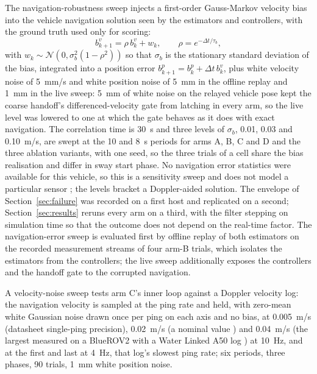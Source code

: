 The navigation-robustness sweep injects a first-order Gauss-Markov velocity bias into the vehicle navigation solution seen by the estimators and controllers, with the ground truth used only for scoring:
\begin{equation}
b^v_{k+1} = \rho\, b^v_k + w_k,\qquad \rho = e^{-\Delta t/\tau_b},
\end{equation}
with $w_k \sim \mathcal{N}(0, \sigma_b^2 (1-\rho^2))$ so that $\sigma_b$ is the stationary standard deviation of the bias,
integrated into a position error $b^p_{k+1} = b^p_k + \Delta t\, b^v_k$, plus white velocity noise of 5~mm/s and white position noise of 5~mm in the offline replay and 1~mm in the live sweep: 5~mm of white noise on the relayed vehicle pose kept the coarse handoff's differenced-velocity gate from latching in every arm, so the live level was lowered to one at which the gate behaves as it does with exact navigation. The correlation time is 30~s and three levels of $\sigma_b$, 0.01, 0.03 and 0.10~m/s, are swept at the 10 and 8~s periods for arms A, B, C and D and the three ablation variants, with one seed, so the three trials of a cell share the bias realisation and differ in sway start phase. No navigation error statistics were available for this vehicle, so this is a sensitivity sweep and does not model a particular sensor \cite{brown2012random,groves2013principles}; the levels bracket a Doppler-aided solution. The envelope of Section~\ref{sec:failure} was recorded on a first host and replicated on a second; Section~\ref{sec:results} reruns every arm on a third, with the filter stepping on simulation time so that the outcome does not depend on the real-time factor. The navigation-error sweep is evaluated first by offline replay of both estimators on the recorded measurement streams of four arm-B trials, which isolates the estimators from the controllers; the live sweep additionally exposes the controllers and the handoff gate to the corrupted navigation.

A velocity-noise sweep tests arm C's inner loop against a Doppler velocity log: the navigation velocity is sampled at the ping rate and held, with zero-mean white Gaussian noise drawn once per ping on each axis and no bias, at 0.005~m/s (datasheet single-ping precision), 0.02~m/s (a nominal value \cite{sahoo2026dvl}) and 0.04~m/s (the largest measured on a BlueROV2 with a Water Linked A50 log \cite{song2023uncertainty}) at 10~Hz, and at the first and last at 4~Hz, that log's slowest ping rate; six periods, three phases, 90 trials, 1~mm white position noise.

